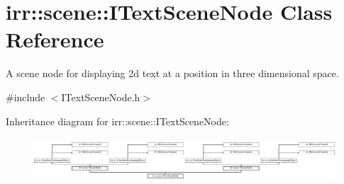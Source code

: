 \hypertarget{classirr_1_1scene_1_1ITextSceneNode}{}\section{irr\+:\+:scene\+:\+:I\+Text\+Scene\+Node Class Reference}
\label{classirr_1_1scene_1_1ITextSceneNode}


A scene node for displaying 2d text at a position in three dimensional space.  




{\ttfamily \#include $<$I\+Text\+Scene\+Node.\+h$>$}

Inheritance diagram for irr\+:\+:scene\+:\+:I\+Text\+Scene\+Node\+:\begin{figure}[H]
\begin{center}
\leavevmode
\includegraphics[height=1.682692cm]{classirr_1_1scene_1_1ITextSceneNode}
\end{center}
\end{figure}
